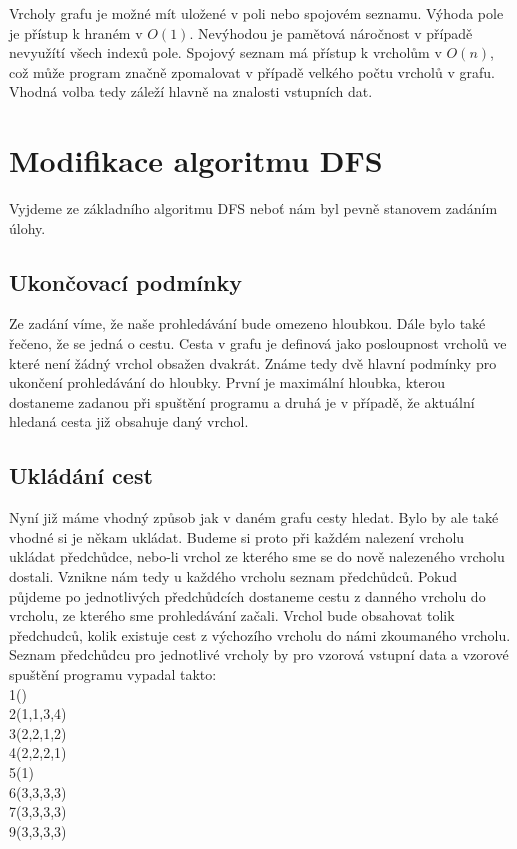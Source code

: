 Vrcholy grafu je možné mít uložené v poli nebo spojovém seznamu. Výhoda pole je přístup k hraném v $O(1)$. Nevýhodou je pamětová náročnost v případě nevyužítí všech indexů pole. Spojový seznam má přístup k vrcholům v $O(n)$, což může program značně zpomalovat v případě velkého počtu vrcholů v grafu. Vhodná volba tedy záleží hlavně na znalosti vstupních dat.

\section{Modifikace algoritmu DFS}
Vyjdeme ze základního algoritmu DFS neboť nám byl pevně stanovem zadáním úlohy.

\subsection{Ukončovací podmínky}
 Ze zadání víme, že naše prohledávání bude omezeno hloubkou. Dále bylo také řečeno, že se jedná o cestu. Cesta v grafu je definová jako posloupnost vrcholů ve které není žádný vrchol obsažen dvakrát. Známe tedy dvě hlavní podmínky pro ukončení prohledávání do hloubky. První je maximální hloubka, kterou dostaneme zadanou při spuštění programu a druhá je v případě, že aktuální hledaná cesta již obsahuje daný vrchol.
 
 \subsection{Ukládání cest}
  Nyní již máme vhodný způsob jak v daném grafu cesty hledat. Bylo by ale také vhodné si je někam ukládat. Budeme si proto při každém nalezení vrcholu ukládat předchůdce, nebo-li vrchol ze kterého sme se do nově nalezeného vrcholu dostali. Vznikne nám tedy u každého vrcholu seznam předchůdců. Pokud půjdeme po jednotlivých předchůdcích dostaneme cestu z danného vrcholu do vrcholu, ze kterého sme prohledávání začali. Vrchol bude obsahovat tolik předchudců, kolik existuje cest z výchozího vrcholu do námi zkoumaného vrcholu.\\
  
  Seznam předchůdcu pro jednotlivé vrcholy by pro vzorová vstupní data a vzorové spuštění programu vypadal takto:\\
  
  1()\\
  2(1,1,3,4)\\
  3(2,2,1,2)\\
  4(2,2,2,1)\\
  5(1)\\
  6(3,3,3,3)\\
  7(3,3,3,3)\\
  9(3,3,3,3)\\
  

